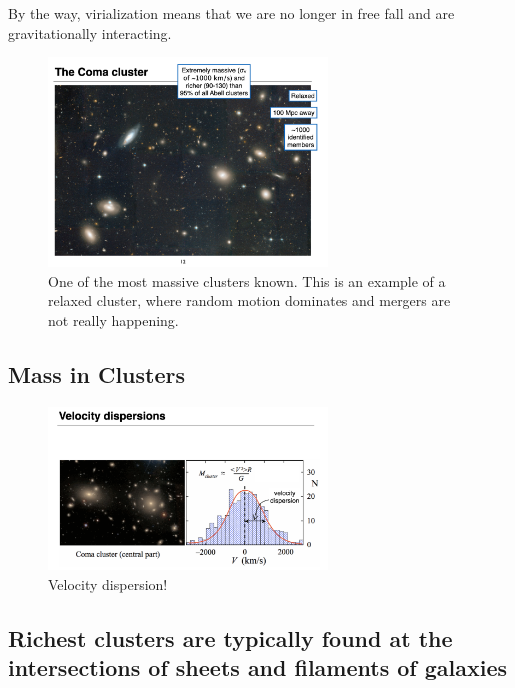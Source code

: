 \documentclass{article}
\begin{document}
By the way, virialization means that we are no longer in free fall and are gravitationally interacting. 

\begin{figure}
    \centering
    \includegraphics[width=0.66\textwidth]{figs/Screen Shot 2021-10-29 at 10.15.41 AM.png}
    \caption{One of the most massive clusters known. This is an example of a relaxed cluster, where random motion dominates and mergers are not really happening. }
    \label{fig:Coma_Cluster}
\end{figure}

\subsection{Mass in Clusters}

\begin{figure}
    \centering
    \includegraphics[width=0.66\textwidth]{figs/Screen Shot 2021-10-29 at 10.17.12 AM.png}
    \caption{Velocity dispersion!}
    \label{fig:velocity_mass_corr}
\end{figure}

\subsection{Richest clusters are typically found at the intersections of sheets and filaments of galaxies}
\end{document}
